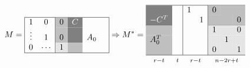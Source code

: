 \[
	M=
	\begin{array}{|cc|c|c|rc|}
		\hline
		1      & 0      & \multicolumn{1}{>{\columncolor{lightgray}}l}{\color{black}0}    & \multicolumn{1}{>{\columncolor{gray}}l}{\color{white}C}     &     & \\
		\vdots & 1      & \multicolumn{1}{>{\columncolor{lightgray}}l}{\color{black}0}    & \multicolumn{1}{>{\columncolor{gray}}l}{\color{white}}      & A_0 & \\
		0      & \cdots & \multicolumn{1}{>{\columncolor{ColorGreyish}}l}{\color{black}1} & \multicolumn{1}{>{\columncolor{lightgray}}l}{\color{black}} &     & \\
		\hline
	\end{array}
	\Rightarrow
	M^*=
	\begin{array}{|c|c|cc|lcr|}
		\hline
		\multicolumn{1}{>{\columncolor{gray}}l}{\color{white}}           &                                     & 1                                     &                                          & \multicolumn{1}{>{\columncolor{lightgray}}l}{\color{black}0}    & \multicolumn{2}{>{\columncolor{lightgray}}l}{\color{black}}                                                                       \\
		\multicolumn{1}{>{\columncolor{gray}}l}{\color{white}-C^T}       &                                     &                                       & 1                                        & \multicolumn{2}{>{\columncolor{lightgray}}l}{\color{black}}     & \multicolumn{1}{>{\columncolor{lightgray}}l}{\color{black}0}                                                                      \\
		\cline{1-1} \cline{5-7}
		\multicolumn{1}{>{\columncolor{lightgray}}l}{\color{black}}      &                                     &                                       &                                          & \multicolumn{1}{>{\columncolor{ColorGreyish}}l}{\color{black}1} & \multicolumn{1}{>{\columncolor{ColorGreyish}}l}{\color{black}}  & \multicolumn{1}{>{\columncolor{ColorGreyish}}l}{\color{black}0} \\
		\multicolumn{1}{>{\columncolor{lightgray}}l}{\color{black}A_0^T} &                                     &                                       &                                          & \multicolumn{1}{>{\columncolor{ColorGreyish}}l}{\color{black}}  & \multicolumn{1}{>{\columncolor{ColorGreyish}}l}{\color{black}1} & \multicolumn{1}{>{\columncolor{ColorGreyish}}l}{\color{black}}  \\
		\multicolumn{1}{>{\columncolor{lightgray}}l}{\color{black}}      &                                     &                                       &                                          & \multicolumn{1}{>{\columncolor{ColorGreyish}}l}{\color{black}0} & \multicolumn{1}{>{\columncolor{ColorGreyish}}l}{\color{black}}  & \multicolumn{1}{>{\columncolor{ColorGreyish}}l}{\color{black}1} \\ \hline
		\multicolumn{1}{c}{\mathsmaller{r-t}}                            & \multicolumn{1}{c}{\mathsmaller{t}} & \multicolumn{2}{c}{\mathsmaller{r-t}} & \multicolumn{3}{c}{\mathsmaller{n-2r+t}}
	\end{array}
\]

